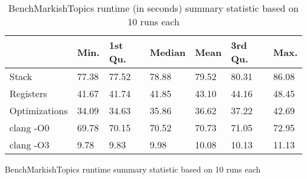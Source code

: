 \begin{table}[h!]
\centering
\begin{tabular}{p{}p{}p{}p{}p{}p{}p{}}
  \hline
 & Min. & 1st Qu. & Median & Mean & 3rd Qu. & Max. \\ 
  \hline
Stack & 77.38 & 77.52 & 78.88 & 79.52 & 80.31 & 86.08 \\ 
  Registers & 41.67 & 41.74 & 41.85 & 43.10 & 44.16 & 48.45 \\ 
  Optimizations & 34.09 & 34.63 & 35.86 & 36.62 & 37.22 & 42.69 \\ 
  clang -O0 & 69.78 & 70.15 & 70.52 & 70.73 & 71.05 & 72.95 \\ 
  clang -O3 & 9.78 & 9.83 & 9.98 & 10.08 & 10.13 & 11.13 \\ 
   \hline
\end{tabular}
\caption{BenchMarkishTopics runtime summary statistic based on 10 runs each}
\caption{BenchMarkishTopics runtime (in seconds) summary statistic based on 10 runs each}
\end{table}
